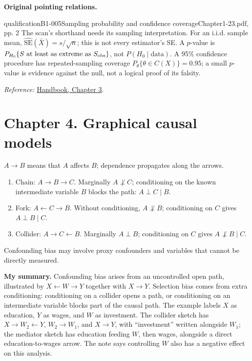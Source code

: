 {\par{}\smallskip\textbf{Original pointing relations.}\par\smallskip
{}
\begin{reviewnote}{qualification}{B1-005}{Sampling probability and confidence coverage}{Chapter1-23.pdf, pp. 2}
The scan's shorthand needs its sampling interpretation. For an i.i.d. sample mean, $\widehat{\mathrm{SE}}(\bar X)=s/\sqrt n$; this is not every estimator's SE. A $p$-value is $P_{H_0}\{S\text{ at least as extreme as }S_{\rm obs}\}$, not $P(H_0\mid\text{data})$. A 95\% confidence procedure has repeated-sampling coverage $P_\theta\{\theta\in C(X)\}=0.95$; a small $p$-value is evidence against the null, not a logical proof of its falsity.
\par\smallskip\textit{Reference:} \href{https://matheusfacure.github.io/python-causality-handbook/03-Stats-Review-The-Most-Dangerous-Equation.html}{Handbook, Chapter 3}.
\end{reviewnote}
\section{Chapter 4. Graphical causal models}
$A\to B$ means that $A$ affects $B$; dependence propagates along the arrows.
\begin{enumerate}
\item Chain: $A\to B\to C$. Marginally $A\not\perp C$; conditioning on the known intermediate variable $B$ blocks the path: $A\perp C\mid B$.
\item Fork: $A\leftarrow C\to B$. Without conditioning, $A\not\perp B$; conditioning on $C$ gives $A\perp B\mid C$.
\item Collider: $A\to C\leftarrow B$. Marginally $A\perp B$; conditioning on $C$ gives $A\not\perp B\mid C$.
\end{enumerate}
Confounding bias may involve proxy confounders and variables that cannot be directly measured.

\textbf{My summary.} Confounding bias arises from an uncontrolled open path, illustrated by $X\leftarrow W\to Y$ together with $X\to Y$. Selection bias comes from extra conditioning: conditioning on a collider opens a path, or conditioning on an intermediate variable blocks part of the causal path. The example labels $X$ as education, $Y$ as wages, and $W$ as investment. The collider sketch has $X\to W_2\leftarrow Y$, $W_2\to W_1$, and $X\to Y$, with ``investment'' written alongside $W_1$; the mediator sketch has education feeding $W$, then wages, alongside a direct education-to-wages arrow. The note says controlling $W$ also has a negative effect on this analysis.

}
